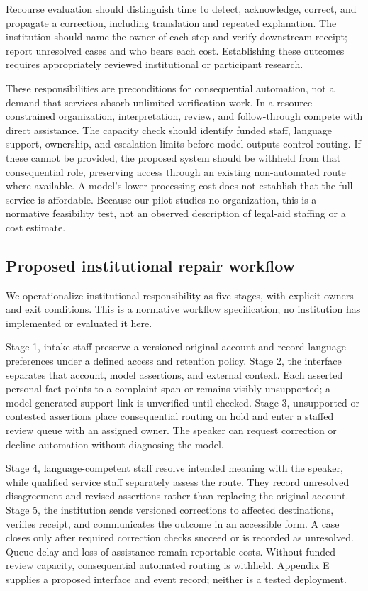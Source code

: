 \documentclass[manuscript,screen,review,anonymous]{acmart}
\begin{document}
Recourse evaluation should distinguish time to detect, acknowledge, correct, and propagate a correction, including translation and repeated explanation. The institution should name the owner of each step and verify downstream receipt; report unresolved cases and who bears each cost. Establishing these outcomes requires appropriately reviewed institutional or participant research.

These responsibilities are preconditions for consequential automation, not a demand that services absorb unlimited verification work. In a resource-constrained organization, interpretation, review, and follow-through compete with direct assistance. The capacity check should identify funded staff, language support, ownership, and escalation limits before model outputs control routing. If these cannot be provided, the proposed system should be withheld from that consequential role, preserving access through an existing non-automated route where available. A model's lower processing cost does not establish that the full service is affordable. Because our pilot studies no organization, this is a normative feasibility test, not an observed description of legal-aid staffing or a cost estimate.

\subsection{Proposed institutional repair workflow}

We operationalize institutional responsibility as five stages, with explicit owners and exit conditions. This is a normative workflow specification; no institution has implemented or evaluated it here.

Stage 1, intake staff preserve a versioned original account and record language preferences under a defined access and retention policy. Stage 2, the interface separates that account, model assertions, and external context. Each asserted personal fact points to a complaint span or remains visibly unsupported; a model-generated support link is unverified until checked. Stage 3, unsupported or contested assertions place consequential routing on hold and enter a staffed review queue with an assigned owner. The speaker can request correction or decline automation without diagnosing the model.

Stage 4, language-competent staff resolve intended meaning with the speaker, while qualified service staff separately assess the route. They record unresolved disagreement and revised assertions rather than replacing the original account. Stage 5, the institution sends versioned corrections to affected destinations, verifies receipt, and communicates the outcome in an accessible form. A case closes only after required correction checks succeed or is recorded as unresolved. Queue delay and loss of assistance remain reportable costs. Without funded review capacity, consequential automated routing is withheld. Appendix E supplies a proposed interface and event record; neither is a tested deployment.
\end{document}
